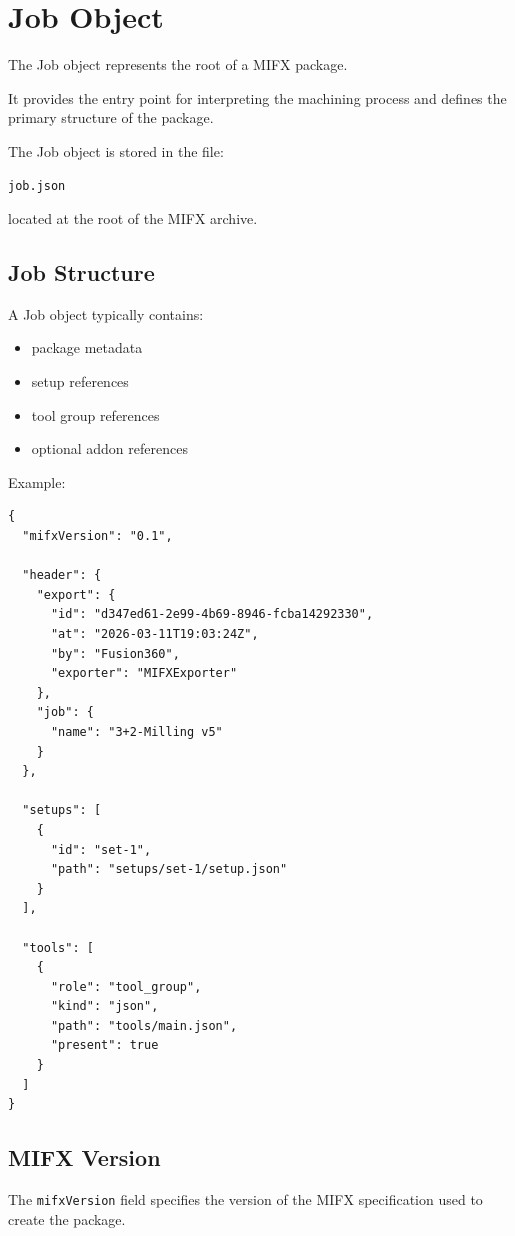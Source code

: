 \section{Job Object}

The Job object represents the root of a MIFX package.

It provides the entry point for interpreting the machining process and defines the primary structure of the package.

The Job object is stored in the file:

\begin{verbatim}
job.json
\end{verbatim}

located at the root of the MIFX archive.

\subsection{Job Structure}

A Job object typically contains:

\begin{itemize}
\item package metadata
\item setup references
\item tool group references
\item optional addon references
\end{itemize}

Example:

\begin{verbatim}
{
  "mifxVersion": "0.1",

  "header": {
    "export": {
      "id": "d347ed61-2e99-4b69-8946-fcba14292330",
      "at": "2026-03-11T19:03:24Z",
      "by": "Fusion360",
      "exporter": "MIFXExporter"
    },
    "job": {
      "name": "3+2-Milling v5"
    }
  },

  "setups": [
    {
      "id": "set-1",
      "path": "setups/set-1/setup.json"
    }
  ],

  "tools": [
    {
      "role": "tool_group",
      "kind": "json",
      "path": "tools/main.json",
      "present": true
    }
  ]
}
\end{verbatim}

\subsection{MIFX Version}

The \texttt{mifxVersion} field specifies the version of the MIFX specification used to create the package.

